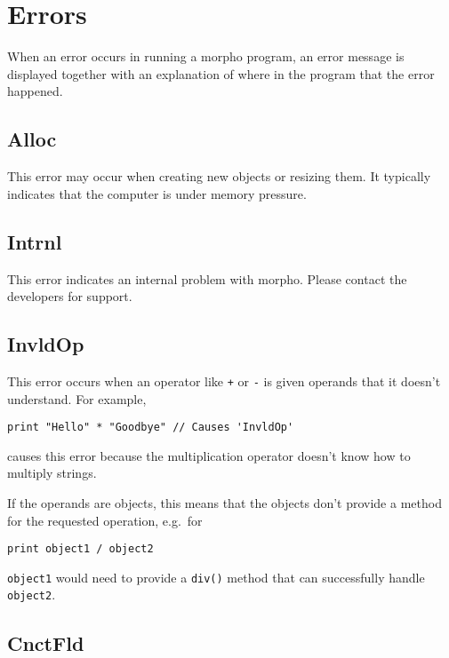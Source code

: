 \hypertarget{errors}{%
\section{Errors}\label{errors}}

When an error occurs in running a morpho program, an error message is
displayed together with an explanation of where in the program that the
error happened.

\hypertarget{alloc}{%
\subsection{Alloc}\label{alloc}}

This error may occur when creating new objects or resizing them. It
typically indicates that the computer is under memory pressure.

\hypertarget{intrnl}{%
\subsection{Intrnl}\label{intrnl}}

This error indicates an internal problem with morpho. Please contact the
developers for support.

\hypertarget{invldop}{%
\subsection{InvldOp}\label{invldop}}

This error occurs when an operator like \texttt{+} or \texttt{-} is
given operands that it doesn't understand. For example,

\begin{lstlisting}
print "Hello" * "Goodbye" // Causes 'InvldOp'
\end{lstlisting}

causes this error because the multiplication operator doesn't know how
to multiply strings.

If the operands are objects, this means that the objects don't provide a
method for the requested operation, e.g.~for

\begin{lstlisting}
print object1 / object2
\end{lstlisting}

\texttt{object1} would need to provide a \texttt{div()} method that can
successfully handle \texttt{object2}.

\hypertarget{cnctfld}{%
\subsection{CnctFld}\label{cnctfld}}

